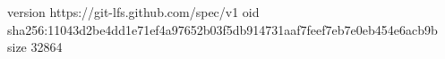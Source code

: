 version https://git-lfs.github.com/spec/v1
oid sha256:11043d2be4dd1e71ef4a97652b03f5db914731aaf7feef7eb7e0eb454e6acb9b
size 32864
